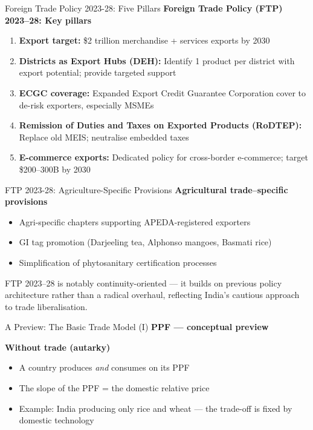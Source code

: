 \documentclass[
  ignorenonframetext,
  aspectratio=169,
]{beamer}
\makeatletter
\providecommand{\tightlist}{%
  \setlength{\itemsep}{0pt}\setlength{\parskip}{0pt}}
\let\quarto@originallabel\label
\DeclareRobustCommand*{\label}[1]{\quarto@originallabel{#1}}
\makeatother
\begin{document}
\begin{frame}{Foreign Trade Policy 2023-28: Five Pillars}
\label{foreign-trade-policy-2023-28-five-pillars}
\textbf{Foreign Trade Policy (FTP) 2023--28: Key pillars}

\begin{enumerate}
\tightlist
\item
  \textbf{Export target:} \$2 trillion merchandise + services exports by
  2030
\item
  \textbf{Districts as Export Hubs (DEH):} Identify 1 product per
  district with export potential; provide targeted support
\item
  \textbf{ECGC coverage:} Expanded Export Credit Guarantee Corporation
  cover to de-risk exporters, especially MSMEs
\item
  \textbf{Remission of Duties and Taxes on Exported Products (RoDTEP):}
  Replace old MEIS; neutralise embedded taxes
\item
  \textbf{E-commerce exports:} Dedicated policy for cross-border
  e-commerce; target \$200--300B by 2030
\end{enumerate}
\end{frame}

\begin{frame}{FTP 2023-28: Agriculture-Specific Provisions}
\label{ftp-2023-28-agriculture-specific-provisions}
\textbf{Agricultural trade--specific provisions}

\begin{itemize}
\tightlist
\item
  Agri-specific chapters supporting APEDA-registered exporters
\item
  GI tag promotion (Darjeeling tea, Alphonso mangoes, Basmati rice)
\item
  Simplification of phytosanitary certification processes
\end{itemize}

FTP 2023--28 is notably continuity-oriented --- it builds on previous
policy architecture rather than a radical overhaul, reflecting India's
cautious approach to trade liberalisation.
\end{frame}

\begin{frame}{A Preview: The Basic Trade Model (I)}
\label{a-preview-the-basic-trade-model-i}
\textbf{PPF --- conceptual preview}

\textbf{Without trade (autarky)}

\begin{itemize}
\tightlist
\item
  A country produces \emph{and} consumes on its PPF
\item
  The slope of the PPF = the domestic relative price
\item
  Example: India producing only rice and wheat --- the trade-off is
  fixed by domestic technology
\end{itemize}
\end{frame}
\end{document}
